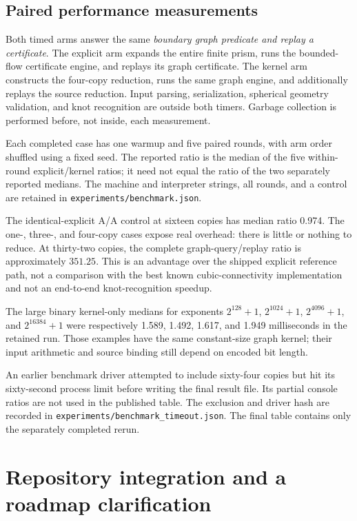 \documentclass[11pt]{article}
\theoremstyle{remark}\newtheorem{remark}[theorem]{Remark}
\DeclareRobustCommand{\code}[1]{\nolinkurl{#1}}
\begin{document}
\subsection{Paired performance measurements}
Both timed arms answer the same \emph{boundary graph predicate and replay a certificate}. The explicit arm expands the entire finite prism, runs the bounded-flow certificate engine, and replays its graph certificate. The kernel arm constructs the four-copy reduction, runs the same graph engine, and additionally replays the source reduction. Input parsing, serialization, spherical geometry validation, and knot recognition are outside both timers. Garbage collection is performed before, not inside, each measurement.

Each completed case has one warmup and five paired rounds, with arm order shuffled using a fixed seed. The reported ratio is the median of the five within-round explicit/kernel ratios; it need not equal the ratio of the two separately reported medians. The machine and interpreter strings, all rounds, and a control are retained in \code{experiments/benchmark.json}.



The identical-explicit A/A control at sixteen copies has median ratio 0.974. The one-, three-, and four-copy cases expose real overhead: there is little or nothing to reduce. At thirty-two copies, the complete graph-query/replay ratio is approximately $351.25$. This is an advantage over the shipped explicit reference path, not a comparison with the best known cubic-connectivity implementation and not an end-to-end knot-recognition speedup.

The large binary kernel-only medians for exponents $2^{128}+1$, $2^{1024}+1$, $2^{4096}+1$, and $2^{16384}+1$ were respectively 1.589, 1.492, 1.617, and 1.949 milliseconds in the retained run. Those examples have the same constant-size graph kernel; their input arithmetic and source binding still depend on encoded bit length.

An earlier benchmark driver attempted to include sixty-four copies but hit its sixty-second process limit before writing the final result file. Its partial console ratios are not used in the published table. The exclusion and driver hash are recorded in \code{experiments/benchmark_timeout.json}. The final table contains only the separately completed rerun.

\section{Repository integration and a roadmap clarification}
\end{document}
